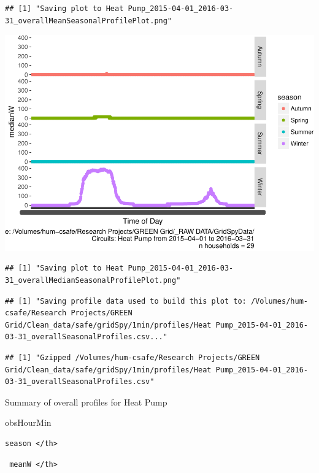 \documentclass[]{article}
\begin{document}
\begin{verbatim}
## [1] "Saving plot to Heat Pump_2015-04-01_2016-03-31_overallMeanSeasonalProfilePlot.png"
\end{verbatim}

\includegraphics{ggProfile_Heat Pump_2015-04-01_2016-03-31_files/figure-latex/overall profiles by season-2.pdf}

\begin{verbatim}
## [1] "Saving plot to Heat Pump_2015-04-01_2016-03-31_overallMedianSeasonalProfilePlot.png"
\end{verbatim}

\begin{verbatim}
## [1] "Saving profile data used to build this plot to: /Volumes/hum-csafe/Research Projects/GREEN Grid/Clean_data/safe/gridSpy/1min/profiles/Heat Pump_2015-04-01_2016-03-31_overallSeasonalProfiles.csv..."
\end{verbatim}

\begin{verbatim}
## [1] "Gzipped /Volumes/hum-csafe/Research Projects/GREEN Grid/Clean_data/safe/gridSpy/1min/profiles/Heat Pump_2015-04-01_2016-03-31_overallSeasonalProfiles.csv"
\end{verbatim}

Summary of overall profiles for Heat Pump

obsHourMin

\begin{verbatim}
season </th>
\end{verbatim}

\begin{verbatim}
 meanW </th>
\end{verbatim}
\end{document}
